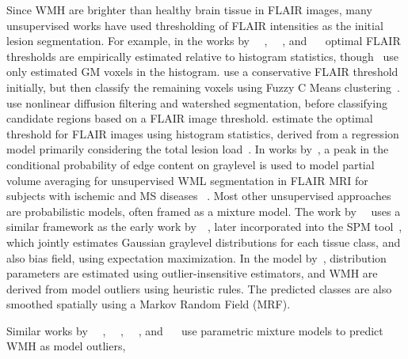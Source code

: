 Since WMH are brighter than healthy brain tissue in FLAIR images,
many unsupervised works have used thresholding of FLAIR intensities
as the initial lesion segmentation.
For example, in the works by%
~\citeauthor{Jack2001}~\cite{Jack2001},%
~\citeauthor{DeBoer2009b}~\cite{DeBoer2009b}, and%
~\citeauthor{Smart2011}~\cite{Smart2011}
optimal FLAIR thresholds are empirically estimated relative to histogram statistics,
though~\citeauthor{DeBoer2009b} use only estimated GM voxels in the histogram.
\citeauthor{Gibson2010} use a conservative FLAIR threshold initially,
but then classify the remaining voxels using Fuzzy C Means clustering~\cite{Gibson2010}.
\citeauthor{Samaille2012} use nonlinear diffusion filtering and watershed segmentation,
before classifying candidate regions based on a FLAIR image threshold.
\citeauthor{Yoo2014} estimate the optimal threshold for FLAIR images using histogram statistics,
derived from a regression model primarily considering the total lesion load~\cite{Yoo2014}.
In works by~\citeauthor{Khademi2014}, a peak in the conditional probability
of edge content on graylevel is used to model partial volume averaging
for unsupervised WML segmentation in FLAIR MRI for subjects with ischemic and MS diseases%
~\cite{Khademi2014,Knight2016a,Khademi2015}.
Most other unsupervised approaches are probabilistic models, often framed as a mixture model.
The work by~\citeauthor{VanLeemput2001}~\cite{VanLeemput2001} uses
a similar framework as the early work by~\citeauthor{Ashburner1997}~\cite{Ashburner1997},
later incorporated into the SPM  tool~\cite{Ashburner2005},
which jointly estimates Gaussian graylevel distributions for each tissue class, and also bias field,
using expectation maximization.
In the model by~\citeauthor{VanLeemput2001},
distribution parameters are estimated using outlier-insensitive estimators,
and WMH are derived from model outliers using heuristic rules.
The predicted classes are also smoothed spatially using a Markov Random Field (MRF).
\par
Similar works by%
~\citeauthor{Bricq2008}~\cite{Bricq2008},%
~\citeauthor{Schmidt2012}~\cite{Schmidt2012},%
~\citeauthor{Jain2015}~\cite{Jain2015}, and%
~\citeauthor{Roura2015}~\cite{Roura2015}
use parametric mixture models to predict WMH as model outliers,
